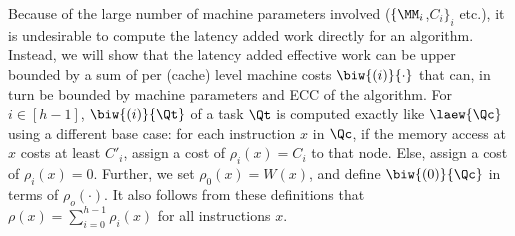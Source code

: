 Because of the large number of machine parameters involved
($\{\MM_i$,$C_i\}_i$ etc.), it is undesirable to compute the latency
added work directly for an algorithm.  Instead, we will show that the
latency added effective work can be upper bounded by a sum of per
(cache) level machine costs $\biw{(i)}{\cdot}$ that can, in turn be
bounded by machine parameters and ECC of the algorithm.  For
$i\in[h-1]$, $\biw{(i)}{\Qt}$ of a task $\Qt$ is computed exactly like
$\laew{\Qc}$ using a different base case: for each instruction $x$ in
$\Qc$, if the memory access at $x$ costs at least $C'_i$, assign a
cost of $\rho_{i}(x) = C_{i}$ to that node.  Else, assign a cost of
$\rho_i(x) = 0$.  Further, we set $\rho_0(x) = W(x)$, and define
$\biw{(0)}{\Qc}$ in terms of $\rho_o(\cdot)$. It also follows from
these definitions that $\rho(x) =
\sum_{i=0}^{h-1}\rho_i(x)$ for all instructions $x$.

